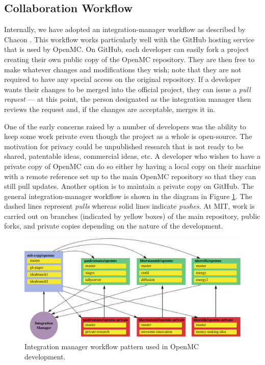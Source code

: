 \documentclass{ansconf}
\begin{document}
\subsection{Collaboration Workflow}

Internally, we have adopted an integration-manager workflow as described by
Chacon \cite{chacon-2009}. This workflow works particularly well with the GitHub
hosting service that is used by OpenMC. On GitHub, each developer can easily
fork a project creating their own public copy of the OpenMC repository. They are
then free to make whatever changes and modifications they wish; note that they
are not required to have any special access on the original repository. If a
developer wants their changes to be merged into the official project, they can
issue a \emph{pull request} --- at this point, the person designated as the
integration manager then reviews the request and, if the changes are acceptable,
merges it in.

One of the early concerns raised by a number of developers was the ability to
keep some work private even though the project as a whole is open-source. The
motivation for privacy could be unpublished research that is not ready to be
shared, patentable ideas, commercial ideas, etc. A developer who wishes to have
a private copy of OpenMC can do so either by having a local copy on their
machine with a remote reference set up to the main OpenMC repository so that
they can still pull updates. Another option is to maintain a private copy on
GitHub. The general integration-manager workflow is shown in the diagram in
Figure \ref{fig:workflow}. The dashed lines represent \emph{pulls} whereas solid
lines indicate \emph{pushes}. At MIT, work is carried out on branches (indicated
by yellow boxes) of the main repository, public forks, and private copies
depending on the nature of the development.

\begin{figure}[!htb]
  \centering
  \includegraphics[width=6.5in]{integration-manager}
  \caption{Integration manager workflow pattern used in OpenMC development.}
  \label{fig:workflow}
\end{figure}
\end{document}
